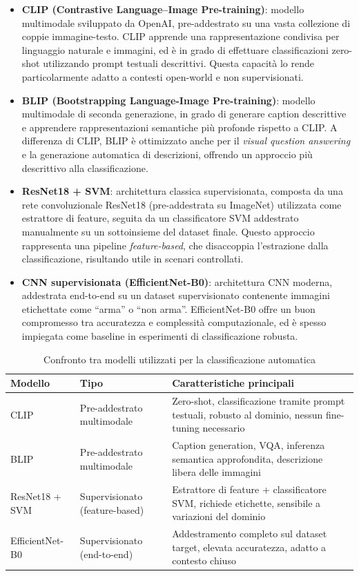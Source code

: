 \begin{itemize}
    \item \textbf{CLIP (Contrastive Language–Image Pre-training)}: modello multimodale sviluppato da OpenAI, pre-addestrato su una vasta collezione di coppie immagine-testo. CLIP apprende una rappresentazione condivisa per linguaggio naturale e immagini, ed è in grado di effettuare classificazioni zero-shot utilizzando prompt testuali descrittivi. Questa capacità lo rende particolarmente adatto a contesti open-world e non supervisionati.

    \item \textbf{BLIP (Bootstrapping Language-Image Pre-training)}: modello multimodale di seconda generazione, in grado di generare caption descrittive e apprendere rappresentazioni semantiche più profonde rispetto a CLIP. A differenza di CLIP, BLIP è ottimizzato anche per il \textit{visual question answering} e la generazione automatica di descrizioni, offrendo un approccio più descrittivo alla classificazione.

    \item \textbf{ResNet18 + SVM}: architettura classica supervisionata, composta da una rete convoluzionale ResNet18 (pre-addestrata su ImageNet) utilizzata come estrattore di feature, seguita da un classificatore SVM addestrato manualmente su un sottoinsieme del dataset finale. Questo approccio rappresenta una pipeline \textit{feature-based}, che disaccoppia l’estrazione dalla classificazione, risultando utile in scenari controllati.

    \item \textbf{CNN supervisionata (EfficientNet-B0)}: architettura CNN moderna, addestrata end-to-end su un dataset supervisionato contenente immagini etichettate come “arma” o “non arma”. EfficientNet-B0 offre un buon compromesso tra accuratezza e complessità computazionale, ed è spesso impiegata come baseline in esperimenti di classificazione robusta.
\end{itemize}

\begin{table}[H]
\centering
\caption{Confronto tra modelli utilizzati per la classificazione automatica}
\label{tab:confronto-modelli}
\begin{tabularx}{\textwidth}{|l|X|X|}
\hline
\textbf{Modello} & \textbf{Tipo} & \textbf{Caratteristiche principali} \\
\hline
CLIP & Pre-addestrato multimodale & Zero-shot, classificazione tramite prompt testuali, robusto al dominio, nessun fine-tuning necessario \\
\hline
BLIP & Pre-addestrato multimodale & Caption generation, VQA, inferenza semantica approfondita, descrizione libera delle immagini \\
\hline
ResNet18 + SVM & Supervisionato (feature-based) & Estrattore di feature + classificatore SVM, richiede etichette, sensibile a variazioni del dominio \\
\hline
EfficientNet-B0 & Supervisionato (end-to-end) & Addestramento completo sul dataset target, elevata accuratezza, adatto a contesto chiuso \\
\hline
\end{tabularx}
\end{table}

